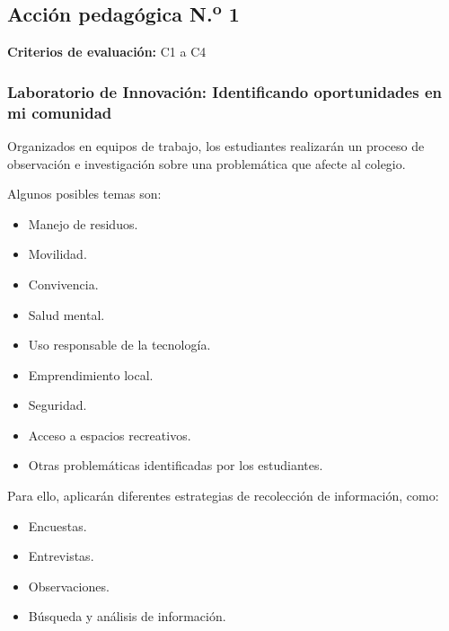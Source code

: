 \documentclass[12pt,a4paper]{article}
\begin{document}
	
	\subsection{Acción pedagógica N.\textsuperscript{o} 1}
	
	\textbf{Criterios de evaluación:} C1 a C4
	
	\subsubsection*{Laboratorio de Innovación:
		Identificando oportunidades en mi comunidad}
	
	Organizados en equipos de trabajo, los estudiantes realizarán un
	proceso de observación e investigación sobre una problemática que
	afecte al colegio.
	
	Algunos posibles temas son:
	
	\begin{itemize}
		
		\item Manejo de residuos.
		
		\item Movilidad.
		
		\item Convivencia.
		
		\item Salud mental.
		
		\item Uso responsable de la tecnología.
		
		\item Emprendimiento local.
		
		\item Seguridad.
		
		\item Acceso a espacios recreativos.
		
		\item Otras problemáticas identificadas por los estudiantes.
		
	\end{itemize}
	
	Para ello, aplicarán diferentes estrategias de recolección de
	información, como:
	
	\begin{itemize}
		
		\item Encuestas.
		
		\item Entrevistas.
		
		\item Observaciones.
		
		\item Búsqueda y análisis de información.
		
	\end{itemize}
	
\end{document}
